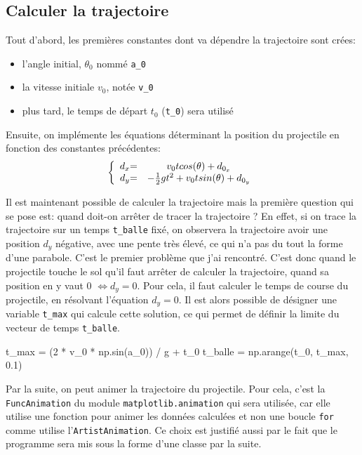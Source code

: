 \documentclass[a4paper,11pt]{article}
\begin{document}
\subsection{Calculer la trajectoire}
Tout d'abord, les premières constantes dont va dépendre la trajectoire sont crées:
\begin{itemize}
	\item l'angle initial, $\theta_0$ nommé \verb|a_0|
	\item la vitesse initiale $v_0$, notée \verb|v_0|
	\item plus tard, le temps de départ $t_0$ (\verb|t_0|) sera utilisé
\end{itemize}
Ensuite, on implémente les équations déterminant la position du projectile en fonction des constantes précédentes:
\[ \left \{
\begin{array}{c @{= \quad} c}
	d_x & v_0 t cos (\theta) + d_{0_x}\\
	d_y &- \frac{1}{2} g t^2 + v_0 t sin(\theta) + d_{0_y}
\end{array}
\right. \]

Il est maintenant possible de calculer la trajectoire mais la première question qui se pose est: quand doit-on arrêter de tracer la trajectoire ? En effet, si on trace la trajectoire sur un temps \verb|t_balle| fixé, on observera la trajectoire avoir une position $d_y$ négative, avec une pente très élevé, ce qui n'a pas du tout la forme d'une parabole. C'est le premier problème que j'ai rencontré. C'est donc quand le projectile touche le sol qu'il faut arrêter de calculer la trajectoire, quand sa position en y vaut 0 $\Leftrightarrow d_y = 0$. Pour cela, il faut calculer le temps de course du projectile, en résolvant l'équation $d_y = 0$. Il est alors possible de désigner une variable \verb|t_max| qui calcule cette solution, ce qui permet de définir la limite du vecteur de temps \verb|t_balle|.
	\begin{python}
	
		t_max = (2 * v_0 * np.sin(a_0)) / g + t_0   
		t_balle = np.arange(t_0, t_max, 0.1)
	\end{python}

Par la suite, on peut animer la trajectoire du projectile. Pour cela, c'est la \verb|FuncAnimation| du module \verb|matplotlib.animation| qui sera utilisée, car elle utilise une fonction pour animer les données calculées et non une boucle \verb|for| comme utilise l'\verb|ArtistAnimation|. Ce choix est justifié aussi par le fait que le programme sera mis sous la forme d'une classe par la suite. 
\end{document}
